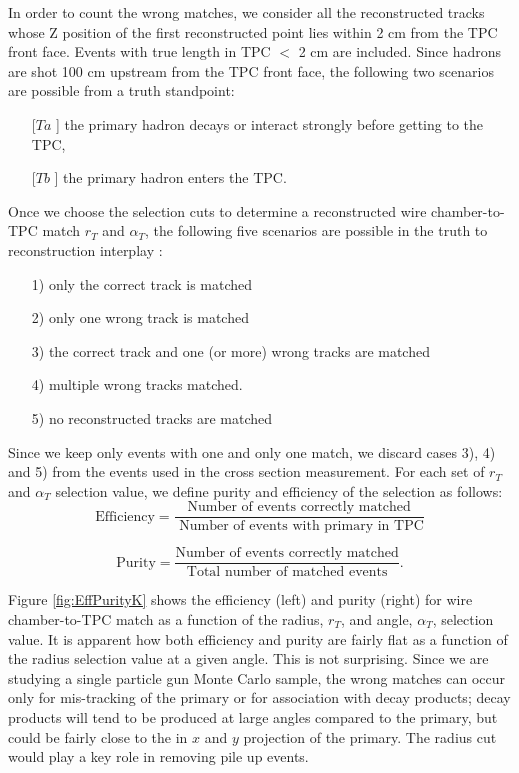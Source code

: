 In order to count the wrong matches, we consider all the reconstructed tracks whose Z position of the first reconstructed point lies within 2 cm from the TPC front face. Events with true length in TPC $<$ 2 cm are included. 
Since hadrons are shot 100 cm upstream from the TPC front face, the following two scenarios are possible from a truth standpoint: 
\begin{itemize}
\item[[$Ta$]] the primary hadron decays or interact strongly before getting to the TPC,
\item[[$Tb$]] the primary hadron enters the TPC.
\end{itemize}

Once we choose the selection cuts to determine a reconstructed wire chamber-to-TPC match $r_{T}$ and $\alpha_{T}$, the following five scenarios are possible in the truth to reconstruction interplay : 
\begin{itemize}
\item[1)] only the correct track is matched
\item[2)] only one wrong track is matched 
\item[3)] the correct track and one (or more) wrong tracks are matched
\item[4)] multiple wrong tracks  matched.
\item[5)] no reconstructed tracks are matched
\end{itemize}

Since we keep only events with one and only one match, we discard cases 3), 4) and 5) from the events used in the cross section measurement. For each set of $r_{T}$ and $\alpha_{T}$ selection value, we define purity and efficiency of the selection as follows:
\begin{equation}
\text{Efficiency} = \frac{\text{Number of events correctly matched}}{\text{ Number of events with primary in TPC}}
\end{equation}

\begin{equation}
\text{Purity} = \frac{\text{Number of events correctly matched}}{\text{Total number of matched events}}.
\end{equation}

Figure \ref{fig:EffPurityK} shows the efficiency (left) and purity (right) for wire chamber-to-TPC match as a function of the radius, $r_{T}$, and angle, $\alpha_{T}$, selection value. It is apparent how both efficiency and purity are fairly flat as a function of the radius selection value at a given angle. This is not surprising. Since we are studying a single particle gun Monte Carlo sample, the wrong matches can occur only for mis-tracking of the primary or for association with decay products;  decay products will tend to be produced at large angles compared to the primary, but could be fairly close to the in $x$ and $y$ projection of the primary. The radius cut would play a key role in removing pile up events. 

